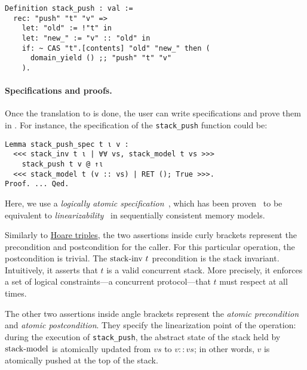 \begin{verbatim}
Definition stack_push : val :=
  rec: "push" "t" "v" =>
    let: "old" := !"t" in
    let: "new_" := "v" :: "old" in
    if: ~ CAS "t".[contents] "old" "new_" then (
      domain_yield () ;; "push" "t" "v"
    ).
\end{verbatim}

\paragraph{Specifications and proofs.}

Once the translation to \ZooLang is done, the user can write specifications and prove them in \Iris.
For instance, the specification of the \texttt{stack_push} function could be:

\begin{verbatim}
Lemma stack_push_spec t ι v :
  <<< stack_inv t ι | ∀∀ vs, stack_model t vs >>>
    stack_push t v @ ↑ι
  <<< stack_model t (v :: vs) | RET (); True >>>.
Proof. ... Qed.
\end{verbatim}

Here, we use a \emph{logically atomic specification}~\cite{DBLP:conf/ecoop/PintoDG14}, which has been proven~\cite{DBLP:journals/pacmpl/BirkedalDGJST21} to be equivalent to \emph{linearizability}~\cite{DBLP:journals/toplas/HerlihyW90} in sequentially consistent memory models.

Similarly to \href{https://en.wikipedia.org/wiki/Hoare_logic}{Hoare triples}, the two assertions inside curly brackets represent the precondition and postcondition for the caller.
For this particular operation, the postcondition is trivial.
The $\mathrm{stack {\hbox{-}} inv}\ t$ precondition is the stack invariant.
Intuitively, it asserts that $t$ is a valid concurrent stack.
More precisely, it enforces a set of logical constraints---a concurrent protocol---that $t$ must respect at all times.

The other two assertions inside angle brackets represent the \emph{atomic precondition} and \emph{atomic postcondition}.
They specify the linearization point of the operation: during the execution of \texttt{stack\_push}, the abstract state of the stack held by $\mathrm{stack {\hbox{-}} model}$ is atomically updated from $\mathit{vs}$ to $v :: \mathit{vs}$; in other words, $v$ is atomically pushed at the top of the stack.
